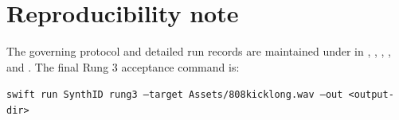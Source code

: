 \documentclass[10pt]{article}
\newcommand{\code}[1]{\texttt{#1}}
\begin{document}
\section*{Reproducibility note}

The governing protocol and detailed run records are maintained under  in , , , , and . The final Rung 3 acceptance command is:

\begin{center}
\small\code{swift run SynthID rung3 --target Assets/808kicklong.wav --out <output-dir>}
\end{center}
\end{document}
